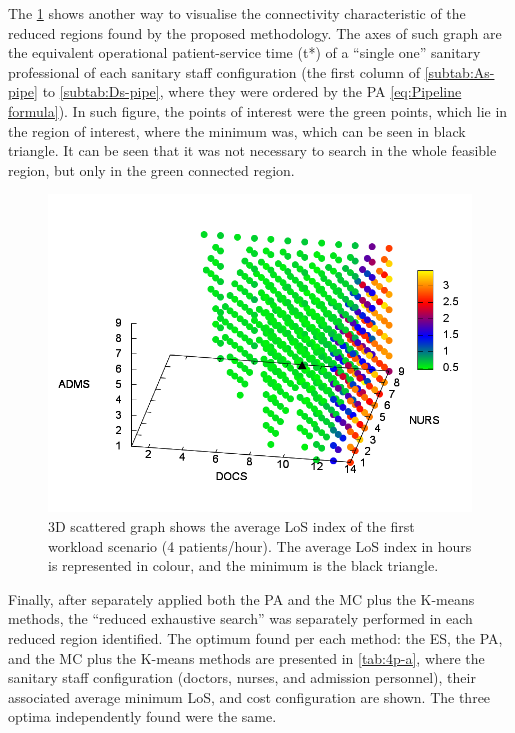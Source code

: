 \documentclass[11pt]{article} %
\begin{document}
The \ref{fig:3D-scattered-graph-25} shows another way to visualise
the connectivity characteristic of the reduced regions found by the
proposed methodology. The axes of such graph are the equivalent operational
patient-service time \foreignlanguage{american}{(t{*})} of a ``single
one'' sanitary professional of each sanitary staff configuration
(the first column of \ref{subtab:As-pipe} to \ref{subtab:Ds-pipe},
where they were ordered by the PA \ref{eq:Pipeline formula}). In
such figure, the points of interest were the green points, which lie
in the region of interest, where the minimum was, which can be seen
in black triangle. It can be seen that it was not necessary to search
in the whole feasible region, but only in the green connected region. 

\begin{figure}[h]
\noindent \begin{centering}
\includegraphics[width=0.95\columnwidth,height=0.2\paperheight]{figs4/v0/6400-602-25-3D-scatter-LoS2}
\par\end{centering}

\caption{3D scattered graph shows the average LoS index of the first workload
scenario (4 patients/hour). The average LoS index in hours is represented
in colour, and the minimum is the black triangle.\label{fig:3D-scattered-graph-25} }
\end{figure}


Finally, after separately applied both the PA and the MC plus the
K-means methods, the \textquotedblleft{}reduced exhaustive search\textquotedblright{}
was separately performed in each reduced region identified. The optimum
found per each method: the ES, the PA, and the MC plus the K-means
methods are presented in \ref{tab:4p-a}, where the sanitary staff
configuration (doctors, nurses, and admission personnel), their associated
average minimum LoS, and cost configuration are shown. The three optima
independently found were the same. 
\end{document}
